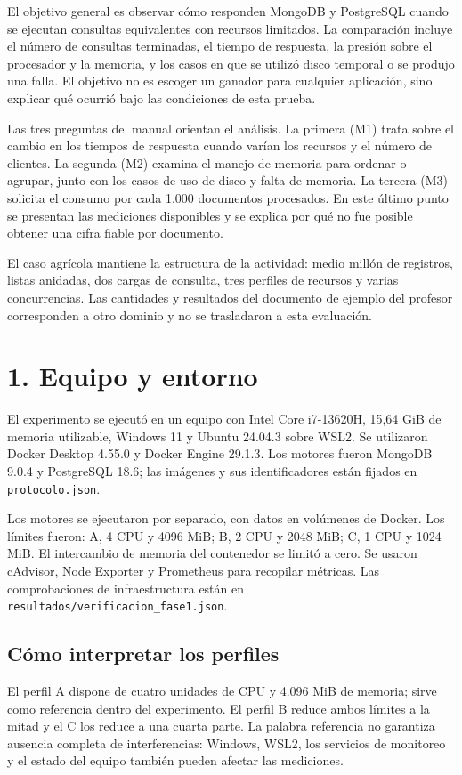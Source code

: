 \documentclass[12pt,letterpaper]{article}
\begin{document}
El objetivo general es observar cómo responden MongoDB y PostgreSQL cuando se ejecutan consultas equivalentes con recursos limitados. La comparación incluye el número de consultas terminadas, el tiempo de respuesta, la presión sobre el procesador y la memoria, y los casos en que se utilizó disco temporal o se produjo una falla. El objetivo no es escoger un ganador para cualquier aplicación, sino explicar qué ocurrió bajo las condiciones de esta prueba.

Las tres preguntas del manual orientan el análisis. La primera (M1) trata sobre el cambio en los tiempos de respuesta cuando varían los recursos y el número de clientes. La segunda (M2) examina el manejo de memoria para ordenar o agrupar, junto con los casos de uso de disco y falta de memoria. La tercera (M3) solicita el consumo por cada 1.000 documentos procesados. En este último punto se presentan las mediciones disponibles y se explica por qué no fue posible obtener una cifra fiable por documento.

El caso agrícola mantiene la estructura de la actividad: medio millón de registros, listas anidadas, dos cargas de consulta, tres perfiles de recursos y varias concurrencias. Las cantidades y resultados del documento de ejemplo del profesor corresponden a otro dominio y no se trasladaron a esta evaluación.

\section*{1. Equipo y entorno}
El experimento se ejecutó en un equipo con Intel Core i7-13620H, 15,64 GiB de memoria utilizable, Windows 11 y Ubuntu 24.04.3 sobre WSL2. Se utilizaron Docker Desktop 4.55.0 y Docker Engine 29.1.3. Los motores fueron MongoDB 9.0.4 y PostgreSQL 18.6; las imágenes y sus identificadores están fijados en \texttt{protocolo.json}.

Los motores se ejecutaron por separado, con datos en volúmenes de Docker. Los límites fueron: A, 4 CPU y 4096 MiB; B, 2 CPU y 2048 MiB; C, 1 CPU y 1024 MiB. El intercambio de memoria del contenedor se limitó a cero. Se usaron cAdvisor, Node Exporter y Prometheus para recopilar métricas. Las comprobaciones de infraestructura están en \texttt{resultados/\allowbreak{}verificacion\_\allowbreak{}fase1.json}.


\subsection*{Cómo interpretar los perfiles}
El perfil A dispone de cuatro unidades de CPU y 4.096 MiB de memoria; sirve como referencia dentro del experimento. El perfil B reduce ambos límites a la mitad y el C los reduce a una cuarta parte. La palabra referencia no garantiza ausencia completa de interferencias: Windows, WSL2, los servicios de monitoreo y el estado del equipo también pueden afectar las mediciones.
\end{document}
